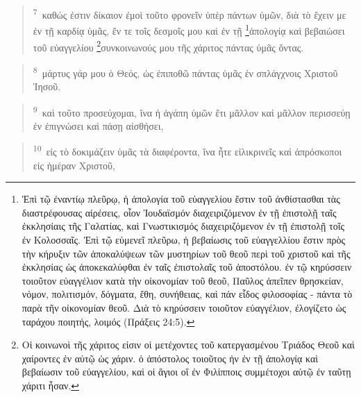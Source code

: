 \documentclass{article}
\newcommand{\currentverse}{1} %
\newcommand{\setcurrentverse}[1]{\renewcommand{\currentverse}{#1}}
\begin{document}
\begin{verse}

\setcurrentverse{7}

\setcounter{footnote}{0}

\textsuperscript{7}~καθώς ἐστιν δίκαιον ἐμοὶ τοῦτο φρονεῖν ὑπὲρ πάντων ὑμῶν, διὰ τὸ ἔχειν με ἐν τῇ καρδίᾳ ὑμᾶς, ἔν τε τοῖς δεσμοῖς μου καὶ ἐν τῇ \footnote{
Ἐπὶ τῷ ἐναντίῳ πλεῦρῳ, ἡ ἀπολογία τοῦ εὐαγγελίου ἔστιν τοῦ ἀνθίστασθαι τὰς διαστρέφουσας αἱρέσεις, οἷον Ἰουδαϊσμόν διαχειριζόμενον ἐν τῇ ἐπιστολῇ ταῖς ἐκκλησίαις τῆς Γαλατίας, καὶ Γνωστικισμός διαχειριζόμενον ἐν τῇ ἐπιστολῇ τοῖς ἐν Κολοσσαῖς. Ἐπὶ τῷ εὐμενεῖ πλεῦρω, ἡ βεβαίωσις τοῦ εὐαγγελλίου ἔστιν πρὸς τὴν κήρυξιν τῶν ἀποκαλύψεων τῶν μυστηρίων τοῦ θεοῦ περὶ τοῦ χριστοῦ καὶ τῆς ἐκκλησίας ὡς ἀποκεκαλύφθαι ἐν ταῖς ἐπιστολαῖς τοῦ ἀποστόλου. ἐν τῷ κηρύσσειν τοιοῦτον εὐαγγέλιον κατὰ τὴν οἰκονομίαν τοῦ θεοῦ, Παῦλος ἀπεῖπεν θρησκείαν, νόμον, πολιτισμόν, δόγματα, ἔθη, συνήθειας, καὶ πάν εἶδος φιλοσοφίας - πάντα τὸ παρὰ τῆν οἰκονομίαν θεοῦ. Διὰ τὸ κηρύσσειν τοιοῦτον εὐαγγέλιον, ἐλογίζετο ὡς ταράχου ποιητής, λοιμός (Πράξεις 24:5).
    }ἀπολογίᾳ καὶ βεβαιώσει τοῦ εὐαγγελίου \footnote{
Οἱ κοινωνοὶ τῆς χάριτος εἰσιν οἱ μετέχοντες τοῦ κατεργασμένου Τριάδος Θεοῦ καὶ χαίροντες ἐν αὐτῷ ὡς χάριν. ὁ ἀπόστολος τοιοῦτος ἠν ἐν τῇ ἀπολογίᾳ καὶ βεβαίωσιν τοῦ εὐαγγελίου, καὶ οἱ ἅγιοι οἵ ἐν Φιλίπποις συμμέτοχοι αὐτῷ ἐν ταῦτῃ χάριτι ἦσαν.
    }συνκοινωνούς μου τῆς χάριτος πάντας ὑμᾶς ὄντας.

\end{verse}

\begin{verse}

\setcurrentverse{8}

\setcounter{footnote}{0}

\textsuperscript{8}~μάρτυς γάρ μου ὁ Θεός, ὡς ἐπιποθῶ πάντας ὑμᾶς ἐν σπλάγχνοις Χριστοῦ Ἰησοῦ.

\end{verse}

\begin{verse}

\setcurrentverse{9}

\setcounter{footnote}{0}

\textsuperscript{9}~καὶ τοῦτο προσεύχομαι, ἵνα ἡ ἀγάπη ὑμῶν ἔτι μᾶλλον καὶ μᾶλλον περισσεύῃ ἐν ἐπιγνώσει καὶ πάσῃ αἰσθήσει,

\end{verse}

\begin{verse}

\setcurrentverse{10}

\setcounter{footnote}{0}

\textsuperscript{10}~εἰς τὸ δοκιμάζειν ὑμᾶς τὰ διαφέροντα, ἵνα ἦτε εἰλικρινεῖς καὶ ἀπρόσκοποι εἰς ἡμέραν Χριστοῦ,

\end{verse}
\end{document}
